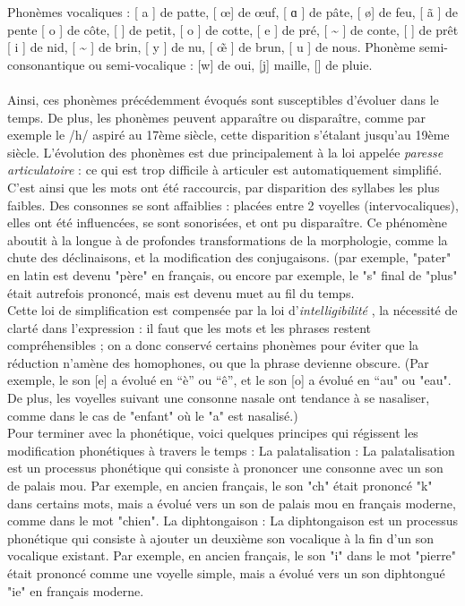 \documentclass[12pt, french, twoside]{report}
\begin{document}
Phonèmes vocaliques :  [ a ] de patte, [ \oe ] de œuf,  [ ɑ ] de pâte, [ \o ] de feu, [ \~a ] de pente [ o ] de côte, [ \textschwa  ] de petit, [ o ] de cotte, [ e ] de pré, [ \~{\textopeno} ] de conte, [ \varepsilon ] de prêt [ i ] de nid, [ \~{\varepsilon} ] de brin, [ y ] de nu, [ \~{\oe} ] de brun, [ u ] de nous. 
Phonème semi-consonantique ou semi-vocalique : [w] de oui, [j] maille, [\textturnh] de pluie. \\ \\
    Ainsi, ces phonèmes précédemment évoqués sont susceptibles d’évoluer dans le temps. De plus, les phonèmes peuvent apparaître ou disparaître, comme par exemple le /h/ aspiré au 17ème siècle, cette disparition s’étalant jusqu'au 19ème siècle.  L’évolution des phonèmes est due principalement à la loi appelée \og \textit{paresse articulatoire} \fg : ce qui est trop difficile à articuler est automatiquement simplifié. C'est ainsi que les mots ont été raccourcis, par disparition des syllabes les plus faibles. Des consonnes se sont affaiblies : placées entre 2 voyelles (intervocaliques), elles ont été influencées, se sont sonorisées, et ont pu disparaître. Ce phénomène aboutit à la longue à de profondes transformations de la morphologie, comme la chute des déclinaisons, et la modification des conjugaisons. (par exemple, "pater" en latin est devenu "père" en français, ou encore par exemple, le "s" final de "plus" était autrefois prononcé, mais est devenu muet au fil du temps. \\
    Cette loi de simplification est compensée par la loi d'\og \textit{intelligibilité} \fg, la nécessité de clarté dans l'expression : il faut que les mots et les phrases restent compréhensibles ; on a donc conservé certains phonèmes pour éviter que la réduction n'amène des homophones, ou que la phrase devienne obscure. (Par exemple, le son [e] a évolué en “è” ou “ê”, et le son [o] a évolué en “au" ou "eau". De plus, les voyelles suivant une consonne nasale ont tendance à se nasaliser, comme dans le cas de "enfant" où le "a" est nasalisé.)\\ 
    Pour terminer avec la phonétique, voici quelques principes qui régissent les modification phonétiques à travers le temps : 
La palatalisation : La palatalisation est un processus phonétique qui consiste à prononcer une consonne avec un son de palais mou. Par exemple, en ancien français, le son "ch" était prononcé "k" dans certains mots, mais a évolué vers un son de palais mou en français moderne, comme dans le mot "chien".
La diphtongaison : La diphtongaison est un processus phonétique qui consiste à ajouter un deuxième son vocalique à la fin d'un son vocalique existant. Par exemple, en ancien français, le son "i" dans le mot "pierre" était prononcé comme une voyelle simple, mais a évolué vers un son diphtongué "ie" en français moderne.
\end{document}
